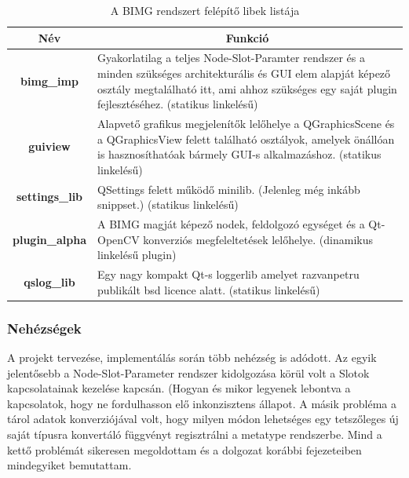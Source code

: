 \documentclass[a4paper,12pt,oneside]{report}
\begin{document}
\begin{table}[h]
\begin{tabular}{p{1cm}|p{12cm}}

\toprule
\multicolumn{1}{c|}{\textbf{Név}} & \multicolumn{1}{|c}{\textbf{Funkció}} \\ \midrule
\multicolumn{1}{c|}{\textbf{bimg\_imp}}  & Gyakorlatilag a teljes Node-Slot-Paramter rendszer és a minden szükséges architekturális és GUI elem alapját képező osztály megtalálható itt, ami ahhoz szükséges egy saját plugin fejlesztéséhez. (statikus linkelésű)\\
\hline
\multicolumn{1}{c|}{\textbf{guiview}}  &  Alapvető grafikus megjelenítők lelőhelye a QGraphicsScene és a QGraphicsView felett található osztályok, amelyek önállóan is hasznosíthatóak bármely GUI-s alkalmazáshoz. (statikus linkelésű)\\
\hline
\multicolumn{1}{c|}{\textbf{settings\_lib}}  & QSettings felett működő minilib. (Jelenleg még inkább snippset.) (statikus linkelésű)\\
\hline
\multicolumn{1}{c|}{\textbf{plugin\_alpha}}  & A BIMG magját képező nodek, feldolgozó egységet és a Qt-OpenCV konverziós megfeleltetések lelőhelye. (dinamikus linkelésű plugin)\\
\hline
\multicolumn{1}{c|}{\textbf{qslog\_lib}}  & Egy nagy kompakt Qt-s loggerlib\cite{website:qslog_site} amelyet razvanpetru publikált bsd licence alatt. (statikus linkelésű)\\
\hline

\end{tabular}
\caption{A BIMG rendszert felépítő libek listája }
\label{table:bimg_libs}
\end{table}
\subsubsection{Nehézségek}
A projekt tervezése, implementálás során több nehézség is adódott. Az egyik jelentősebb a Node-Slot-Parameter rendszer kidolgozása körül volt a Slotok kapcsolatainak kezelése kapcsán. (Hogyan és mikor legyenek lebontva a kapcsolatok, hogy ne fordulhasson elő inkonzisztens állapot. A másik probléma a tárol adatok konverziójával volt, hogy milyen módon lehetséges egy tetszőleges új saját típusra konvertáló függvényt regisztrálni a metatype rendszerbe. Mind a kettő problémát sikeresen megoldottam és a dolgozat korábbi fejezeteiben mindegyiket bemutattam.
\end{document}
